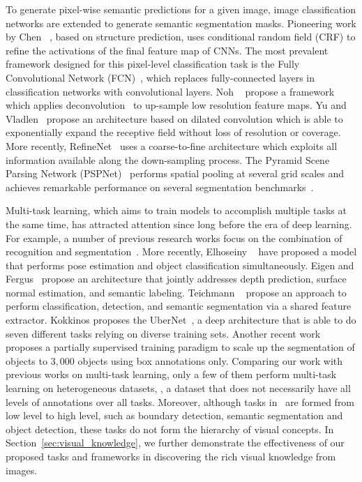 \documentclass[runningheads]{llncs}
\begin{document}
 To generate pixel-wise semantic predictions for a given image, image classification networks \cite{krizhevsky2012imagenet,simonyan2014very,szegedy2015going,he2016deep} are extended to generate semantic segmentation masks. Pioneering work by Chen \etal~\cite{chen2014semantic}, based on structure prediction, uses conditional random field (CRF) to refine the activations of the final feature map of CNNs. The most prevalent framework designed for this pixel-level classification task is the Fully Convolutional Network (FCN)~\cite{long2015fully}, which replaces fully-connected layers in classification networks with convolutional layers. Noh \etal~\cite{noh2015learning} propose a framework which applies deconvolution~\cite{zeiler2011adaptive} to up-sample low resolution feature maps. Yu and Vladlen~\cite{yu2015multi} propose an architecture based on dilated convolution which is able to exponentially expand the receptive field without loss of resolution or coverage. More recently, RefineNet~\cite{lin2017refinenet} uses a coarse-to-fine architecture which exploits all information available along the down-sampling process. The Pyramid Scene Parsing Network (PSPNet)~\cite{zhao2017pyramid} performs spatial pooling at several grid scales and achieves remarkable performance on several segmentation benchmarks~\cite{everingham2010pascal,cordts2016cityscapes,zhou2017scene}. 

 Multi-task learning, which aims to train models to accomplish multiple tasks at the same time, has attracted attention since long before the era of deep learning. For example, a number of previous research works focus on the combination of recognition and segmentation~\cite{keeler1991integrated,kokkinos2005expectation,maire2011object}. More recently, Elhoseiny \etal~\cite{elhoseiny2015convolutional} have proposed a model that performs pose estimation and object classification simultaneously. Eigen and Fergus~\cite{eigen2015predicting} propose an architecture that jointly addresses depth prediction, surface normal estimation, and semantic labeling. Teichmann \etal~\cite{teichmann2016multinet} propose an approach to perform classification, detection, and semantic segmentation via a shared feature extractor. Kokkinos proposes the UberNet~\cite{kokkinos2016ubernet}, a deep architecture that is able to do seven different tasks relying on diverse training sets. Another recent work \cite{hu2017learning} proposes a partially supervised training paradigm to scale up the segmentation of objects to $3,000$ objects using box annotations only. Comparing our work with previous works on multi-task learning, only a few of them perform multi-task learning on heterogeneous datasets, \ie, a dataset that does not necessarily have all levels of annotations over all tasks. Moreover, although tasks in~\cite{kokkinos2016ubernet} are formed from low level to high level, such as boundary detection, semantic segmentation and object detection, these tasks do not form the hierarchy of visual concepts. In Section~\ref{sec:visual_knowledge}, we further demonstrate the effectiveness of our proposed tasks and frameworks in discovering the rich visual knowledge from images.
\end{document}
